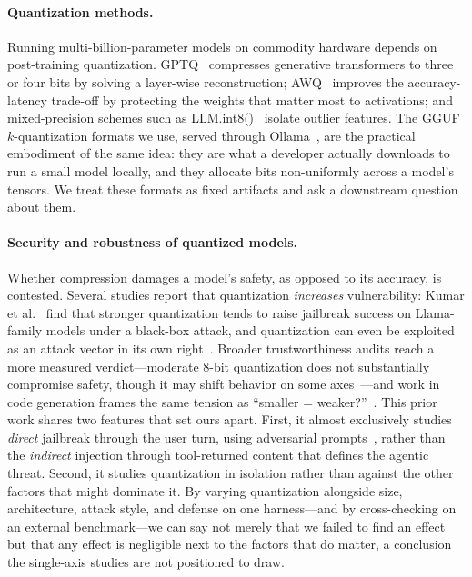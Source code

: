\documentclass[11pt]{article}
\begin{document}
\paragraph{Quantization methods.}
Running multi-billion-parameter models on commodity hardware depends on
post-training quantization. GPTQ~\cite{frantar2022gptq} compresses
generative transformers to three or four bits by solving a layer-wise
reconstruction; AWQ~\cite{lin2024awq} improves the accuracy-latency
trade-off by protecting the weights that matter most to activations; and
mixed-precision schemes such as LLM.int8()~\cite{dettmers2022llmint8}
isolate outlier features. The GGUF $k$-quantization formats we use, served
through Ollama~\cite{ollama}, are the practical embodiment of the same idea:
they are what a developer actually downloads to run a small model locally,
and they allocate bits non-uniformly across a model's tensors. We treat
these formats as fixed artifacts and ask a downstream question about them.

\paragraph{Security and robustness of quantized models.}
Whether compression damages a model's safety, as opposed to its accuracy,
is contested. Several studies report that quantization \emph{increases}
vulnerability: Kumar et al.~\cite{kumar2024increased} find that stronger
quantization tends to raise jailbreak success on Llama-family models under a
black-box attack, and quantization can even be exploited as an attack
vector in its own right~\cite{egashira2024exploiting}. Broader
trustworthiness audits reach a more measured verdict---moderate 8-bit
quantization does not substantially compromise safety, though it may shift
behavior on some axes~\cite{hong2024decoding}---and work in code generation
frames the same tension as ``smaller = weaker?''~\cite{smallerweaker2025}.
This prior work shares two features that set ours apart. First, it almost
exclusively studies \emph{direct} jailbreak through the user turn, using
adversarial prompts~\cite{wei2023jailbroken, zou2023universal}, rather than
the \emph{indirect} injection through tool-returned content that defines the
agentic threat. Second, it studies quantization in isolation rather than
against the other factors that might dominate it. By varying quantization
alongside size, architecture, attack style, and defense on one harness---and
by cross-checking on an external benchmark---we can say not merely that we
failed to find an effect but that any effect is negligible next to the
factors that do matter, a conclusion the single-axis studies are not
positioned to draw.
\end{document}

